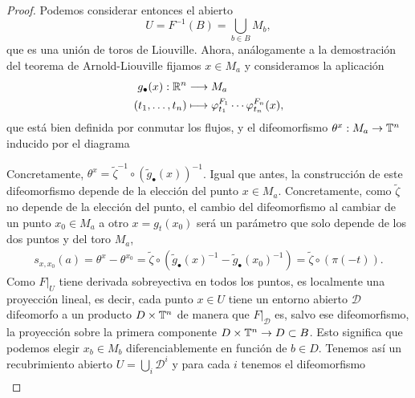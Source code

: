 \begin{proof}
  Podemos considerar entonces el abierto 
  \begin{equation*}
    U=F^{-1}(B)=\bigcup_{b\in B}M_b,
  \end{equation*}
  que es una unión de toros de Liouville. Ahora, análogamente a la demostración del teorema de Arnold-Liouville fijamos $x\in M_a$ y consideramos la aplicación
  \begin{align*}
    g_\bullet (x) :\mathbb{R}^n&\longrightarrow M_a\\ 
    (t_1,\dots,t_n) &\longmapsto \varphi_{t_1}^{F_1}\cdots \varphi_{t_n}^{F_n}(x), 
    \end{align*}
    que está bien definida por conmutar los flujos, y el difeomorfismo $\theta^x:M_a\rightarrow \mathbb{T}^n$ inducido por el diagrama
  \begin{center}
   \end{center}
     Concretamente, $\theta^x=\tilde{\zeta}^{-1}\circ (\tilde{g}_\bullet(x))^{-1}$. Igual que antes, la construcción de este difeomorfismo depende de la elección del punto $x\in M_a$. Concretamente, como $\tilde{\zeta}$ no depende de la elección del punto, el cambio del difeomorfismo al cambiar de un punto $x_0\in M_a$ a otro $x=g_t(x_0)$ será un parámetro que solo depende de los dos puntos y del toro $M_a$,
     \begin{align*}
       s_{x,x_0}(a)=\theta^x-\theta^{x_0}=\tilde{\zeta}\circ (\tilde{g}_\bullet(x)^{-1}-\tilde{g}_\bullet(x_0)^{-1}) = \tilde{\zeta} \circ (\pi(-t)).
     \end{align*}
     Como $F|_{U}$ tiene derivada sobreyectiva en todos los puntos, es localmente una proyección lineal, es decir, cada punto $x\in U$ tiene un entorno abierto $\mathscr{D}$ difeomorfo a un producto $D\times \mathbb{T}^n$ de manera que $F|_{\mathscr{D}}$ es, salvo ese difeomorfismo, la proyección sobre la primera componente $D\times \mathbb{T}^n \rightarrow D\subset B$. Esto significa que podemos elegir $x_b\in M_b$ diferenciablemente en función de $b\in D$. 
     Tenemos así un recubrimiento abierto $U=\bigcup_i \mathscr D^i$ y para cada $i$ tenemos el difeomorfismo
       \begin{align*}

\end{align*}
\end{proof}
